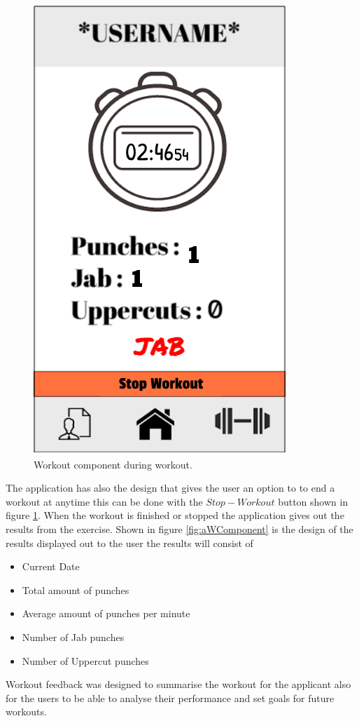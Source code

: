 \documentclass[a4paper,12pt]{report}
\begin{document}
    \begin{figure}[h]
        \begin{center}
        \includegraphics[scale=.5]{images/workoutAfterPunch.png}
        \caption{Workout component during workout.}
        \label{fig:ipWComponent}
        \end{center}
    \end{figure}

The application has also the design that gives the user an option to to end a workout at anytime this can be done with the $Stop-Workout$ button shown in figure \ref{fig:ipWComponent}.
When the workout is finished or stopped the application gives out the results from the exercise.
Shown in figure \ref{fig:aWComponent} is the design of the results displayed out to the user the results will consist of 
\begin{itemize}
    \item Current Date 
    \item Total amount of punches
    \item Average amount of punches per minute
    \item Number of Jab punches
    \item Number of Uppercut punches
\end{itemize}
Workout feedback was designed to summarise the workout for the applicant also for the users to be able to analyse their performance and set goals for future workouts. 
\end{document}
